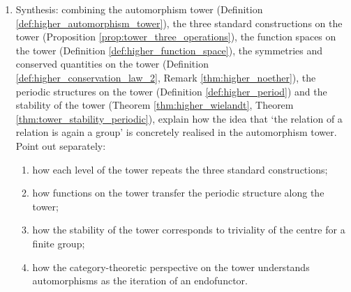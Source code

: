 \begin{enumerate}[leftmargin=3em, label=\textbf{Exercise \arabic*}]
    \item Synthesis: combining the automorphism tower (Definition \ref{def:higher_automorphism_tower}),
    the three standard constructions on the tower (Proposition \ref{prop:tower_three_operations}),
    the function spaces on the tower (Definition \ref{def:higher_function_space}),
    the symmetries and conserved quantities on the tower (Definition \ref{def:higher_conservation_law_2}, Remark \ref{thm:higher_noether}),
    the periodic structures on the tower (Definition \ref{def:higher_period})
    and the stability of the tower (Theorem \ref{thm:higher_wielandt}, Theorem \ref{thm:tower_stability_periodic}),
    explain how the idea that `the relation of a relation is again a group' is concretely realised in the automorphism tower.
    Point out separately:
    \begin{enumerate}[label=(\roman*)]
        \item how each level of the tower repeats the three standard constructions;
        \item how functions on the tower transfer the periodic structure along the tower;
        \item how the stability of the tower corresponds to triviality of the centre for a finite group;
        \item how the category-theoretic perspective on the tower understands automorphisms as the iteration of an endofunctor.
    \end{enumerate}
\end{enumerate}
